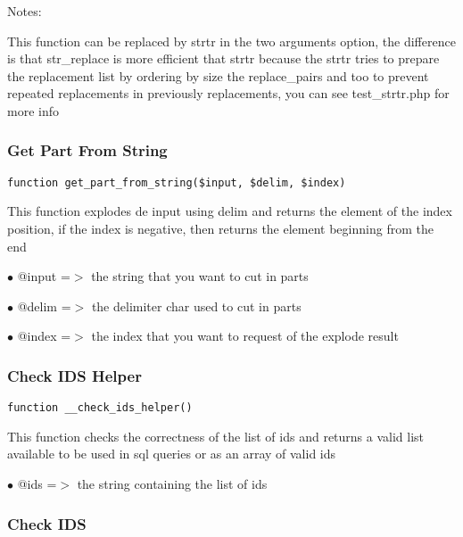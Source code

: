 \documentclass[a4paper]{article}
\begin{document}
Notes:

This function can be replaced by strtr in the two arguments option, the
difference is that str\_replace is more efficient that strtr because the
strtr tries to prepare the replacement list by ordering by size the
replace\_pairs and too to prevent repeated replacements in previously
replacements, you can see test\_strtr.php for more info

\hypertarget{toc248}{}
\subsubsection{Get Part From String}

\begin{lstlisting}
function get_part_from_string($input, $delim, $index)
\end{lstlisting}

This function explodes de input using delim and returns the element of the
index position, if the index is negative, then returns the element beginning
from the end

\begin{compactitem}
\item[\color{myblue}$\bullet$] @input =$>$ the string that you want to cut in parts
\item[\color{myblue}$\bullet$] @delim =$>$ the delimiter char used to cut in parts
\item[\color{myblue}$\bullet$] @index =$>$ the index that you want to request of the explode result
\end{compactitem}

\hypertarget{toc249}{}
\subsubsection{Check IDS Helper}

\begin{lstlisting}
function __check_ids_helper()
\end{lstlisting}

This function checks the correctness of the list of ids and returns a valid
list available to be used in sql queries or as an array of valid ids

\begin{compactitem}
\item[\color{myblue}$\bullet$] @ids =$>$ the string containing the list of ids
\end{compactitem}

\hypertarget{toc250}{}
\subsubsection{Check IDS}
\end{document}
